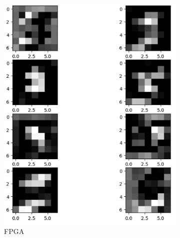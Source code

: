 \begin{figure}[H]
\centering
    \begin{subfigure}[b]{0.45\linewidth}
        \includegraphics[width=1\linewidth]{Images/fpgam2.png}
        \caption{FPGA}
        \label{fig:enter-label}
    \end{subfigure}
    \begin{subfigure}[b]{0.45\linewidth}

\end{subfigure}
\end{figure}
